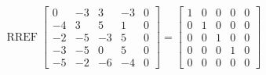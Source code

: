 \begin{exerciseAnswer} 


\[\operatorname{RREF} \left[\begin{array}{cccc|c}
0 & -3 & 3 & -3 & 0 \\
-4 & 3 & 5 & 1 & 0 \\
-2 & -5 & -3 & 5 & 0 \\
-3 & -5 & 0 & 5 & 0 \\
-5 & -2 & -6 & -4 & 0
\end{array}\right] = \left[\begin{array}{cccc|c}
1 & 0 & 0 & 0 & 0 \\
0 & 1 & 0 & 0 & 0 \\
0 & 0 & 1 & 0 & 0 \\
0 & 0 & 0 & 1 & 0 \\
0 & 0 & 0 & 0 & 0
\end{array}\right] \]



\end{exerciseAnswer}

